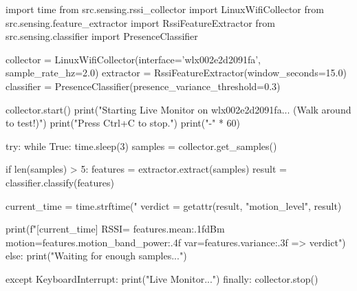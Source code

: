 \documentclass[12pt, a4paper]{article}
\begin{document}
\begin{otherlanguage}{english}
\begin{codebox}
import time
from src.sensing.rssi_collector import LinuxWifiCollector
from src.sensing.feature_extractor import RssiFeatureExtractor
from src.sensing.classifier import PresenceClassifier

collector = LinuxWifiCollector(interface='wlx002e2d2091fa', sample_rate_hz=2.0)
extractor = RssiFeatureExtractor(window_seconds=15.0)
classifier = PresenceClassifier(presence_variance_threshold=0.3)

collector.start()
print("Starting Live Monitor on wlx002e2d2091fa... (Walk around to test!)")
print("Press Ctrl+C to stop.")
print("-" * 60)

try:
    while True:
        time.sleep(3)
        samples = collector.get_samples()
        
        if len(samples) > 5:
            features = extractor.extract(samples)
            result = classifier.classify(features)
            
            current_time = time.strftime("%
            verdict = getattr(result, "motion_level", result)
            
            print(f"[{current_time}] RSSI= {features.mean:.1f}dBm  motion={features.motion_band_power:.4f} var={features.variance:.3f} => {verdict}")
        else:
            print("Waiting for enough samples...")
            
except KeyboardInterrupt:
    print("\nStopping Live Monitor...")
finally:
    collector.stop()
\end{codebox}
\end{otherlanguage}
\end{document}
